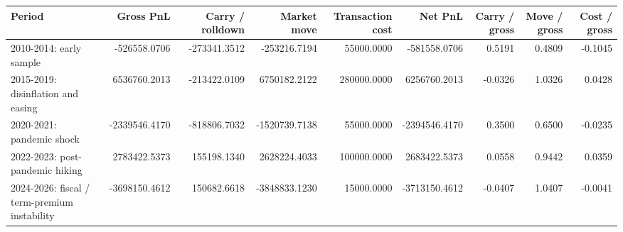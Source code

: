\begin{tabular}{lrrrrrrrr}
\toprule
Period & Gross PnL & Carry / rolldown & Market move & Transaction cost & Net PnL & Carry / gross & Move / gross & Cost / gross \\
\midrule
2010-2014: early sample & -526558.0706 & -273341.3512 & -253216.7194 & 55000.0000 & -581558.0706 & 0.5191 & 0.4809 & -0.1045 \\
2015-2019: disinflation and easing & 6536760.2013 & -213422.0109 & 6750182.2122 & 280000.0000 & 6256760.2013 & -0.0326 & 1.0326 & 0.0428 \\
2020-2021: pandemic shock & -2339546.4170 & -818806.7032 & -1520739.7138 & 55000.0000 & -2394546.4170 & 0.3500 & 0.6500 & -0.0235 \\
2022-2023: post-pandemic hiking & 2783422.5373 & 155198.1340 & 2628224.4033 & 100000.0000 & 2683422.5373 & 0.0558 & 0.9442 & 0.0359 \\
2024-2026: fiscal / term-premium instability & -3698150.4612 & 150682.6618 & -3848833.1230 & 15000.0000 & -3713150.4612 & -0.0407 & 1.0407 & -0.0041 \\
\bottomrule
\end{tabular}
